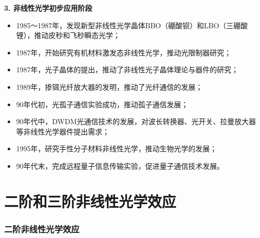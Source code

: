 \documentclass{beamer}
\newenvironment{slide}{
    \begin{frame}{\bfseries{\sectiontitle}}
}{
    \end{frame}
}
\let\sectiononly\section
\renewcommand{\section}[1]{
    \sectiononly{#1}
    \let\sectiontitle\relax
    \newcommand{\sectiontitle}{#1}
}
\begin{document}
\begin{slide}
    \textbf{3. 非线性光学初步应用阶段}
    \footnotesize{
    \begin{itemize}
        \item 1985～1987年，发现新型非线性光学晶体BBO（硼酸钡）和LBO（三硼酸锂），推动皮秒和飞秒瞬态光学；

        \item 1987年，开始研究有机材料激发态非线性光学，推动光限制器研究；

        \item 1987年，光子晶体的提出，推动了非线性光子晶体理论与器件的研究；

        \item 1989年，掺铒光纤放大器的发明，推动了光纤通信的发展；

        \item 90年代初，光孤子通信实验成功，推动孤子通信发展；

        \item 90年代中，DWDM光通信技术的发展，对波长转换器、光开关、拉曼放大器等非线性光学器件提出需求；

        \item 1995年，研究手性分子材料非线性光学，推动生物光学的发展；

        \item 90年代末，完成远程量子信息传输实验，促进量子通信技术发展。
    \end{itemize}
    }
\end{slide}

\part{二阶和三阶非线性光学效应}

\begin{frame}
    \partpage
    \tableofcontents
\end{frame}

\section{二阶非线性光学效应}
\end{document}
